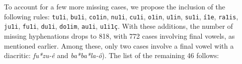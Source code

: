 To account for a few more missing cases, we propose the inclusion of the following rules: 
\texttt{tu1i}, \texttt{bu1i}, \texttt{co1in}, \texttt{nu1i}, \texttt{cu1i}, \texttt{o1in}, \texttt{u1in}, \texttt{su1i}, \texttt{í1e}, \texttt{ra1is},
\texttt{ju1i}, \texttt{fu1i}, \texttt{du1i}, \texttt{do1im}, \texttt{au1i}, \texttt{u1i1ç}.
With these additions, the number of missing hyphenations drops to 818, with 772 cases involving final vowels,
as mentioned earlier. Among these, only two cases involve a final vowel with a diacritic: \emph{fu*zu-ê} and \emph{ba*ba*la-ô}).
The list of the remaining 46 follows:
